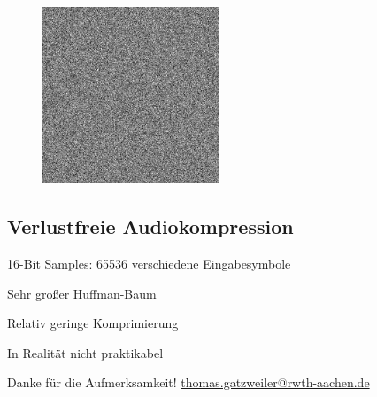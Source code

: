 \documentclass[xcolor=dvipsnames,presentation]{beamer}    %
\makeatletter
\renewcommand*{\email}{\url{thomas.gatzweiler@rwth-aachen.de}}
\newenvironment{witemize}{\itemize\setlength{\itemsep}{1em}}{\enditemize}
\makeatother
\begin{document}
\begin{frame}{\insertsubsection}
\begin{figure}[T]
  \centering
  \includegraphics[width=0.470\textwidth]{bilder/uniformnoise.png}
  \hfill
\end{figure}
\end{frame}

\subsection{Verlustfreie Audiokompression}
\begin{frame}{\insertsubsection}
\begin{witemize}
\item 16-Bit Samples: 65536 verschiedene Eingabesymbole
\item Sehr großer Huffman-Baum
\item Relativ geringe Komprimierung
\item In Realität nicht praktikabel
\end{witemize}
\end{frame}


\begin{frame}[label=finalSlide]
  \label{LastPage}
  \begin{center}
    \vfill
    {\Large
    \textcolor{i6blue}{Danke für die Aufmerksamkeit!}
    }
     \vfill
     \inserttitle
    \vfill
    {\Large \insertauthor}
    \vfill
    \email{}
  \end{center}
\end{frame}
\end{document}
